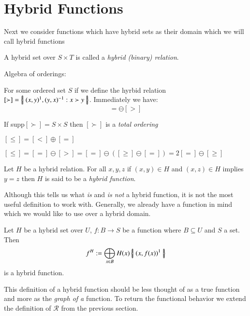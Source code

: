 \section{Hybrid Functions}

Next we consider functions which have hybrid sets as their domain which we will call hybrid functions

\begin{definition}
A hybrid set over $S \times T$ is called a \emph{hybrid (binary) relation}.
\end{definition}

\begin{example}
Algebra of orderings:

For some ordered set $S$ if we define the hyrbid relation $[\succ] = \left\{ \! \left| \;  (x,y)^1, (y,x)^{-1} : x \succ y  \; \right| \! \right\}$.
Immediately we have:
\begin{equation}
[<] = \ominus [>]
\end{equation}

If supp$[\succ] = S \times S$ then $[\succ]$ is a \emph{total ordering}

$[\le] = [<] \oplus [=]$

$[\le] = [=] \ominus [>] = [=] \ominus ( [\ge] \ominus [=] ) = 2[=] \ominus [\ge]$

\end{example}

\begin{definition}
Let $H$ be a hybrid relation. For all $x,y,z$ if $(x,y) \in H$ and $(x,z) \in H$ implies $y=z$ then $H$ is said to be a \emph{hybrid function}.
\end{definition}

Although this tells us what \emph{is} and \emph{is not} a hybrid function, it is not the most useful definition to work with. Generally, we already have a function in mind which we would like to use over a hybrid domain.

\begin{theorem}
Let $H$ be a hybrid set over $U$, $f:B \to S$ be a function where $B \subseteq U$ and $S$ a set. Then
\begin{equation}
f^H := \bigoplus_{x \in B} H(x) \left\{ \! \left| \;  (x, f(x) )^1  \; \right| \! \right\}
\end{equation}
is a hybrid function.
\end{theorem}

This definition of a hybrid function should be less thought of as a true function and more as the \emph{graph of a} function.
To return the functional behavior we extend the definition of $\mathcal{R}$ from the previous section.

